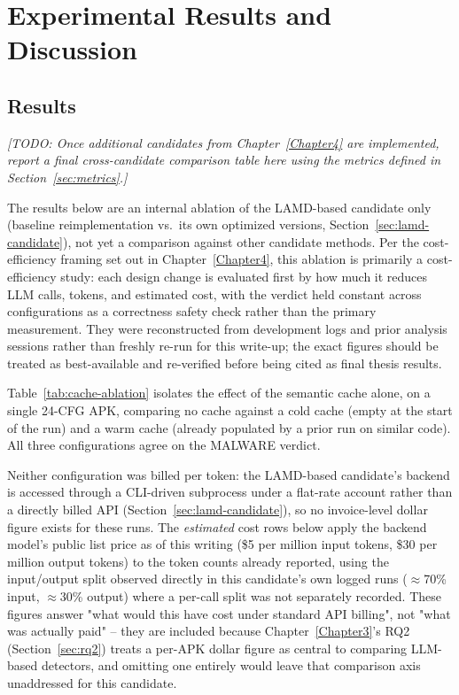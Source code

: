 \chapter{Experimental Results and Discussion}
\label{Chapter5}

\section{Results}

\textit{[TODO: Once additional candidates from Chapter~\ref{Chapter4} are
implemented, report a final cross-candidate comparison table here using the
metrics defined in Section~\ref{sec:metrics}.]}

The results below are an internal ablation of the LAMD-based candidate
only (baseline reimplementation vs.\ its own optimized versions,
Section~\ref{sec:lamd-candidate}), not yet a comparison against other
candidate methods. Per the cost-efficiency framing set out in
Chapter~\ref{Chapter4}, this ablation is primarily a cost-efficiency
study: each design change is evaluated first by how much it reduces LLM
calls, tokens, and estimated cost, with the verdict held constant across
configurations as a correctness safety check rather than the primary
measurement. They were reconstructed from development logs and prior
analysis sessions rather than freshly re-run for this write-up; the exact
figures should be treated as best-available and re-verified before being
cited as final thesis results.

Table~\ref{tab:cache-ablation} isolates the effect of the semantic cache
alone, on a single 24-CFG APK, comparing no cache against a cold cache
(empty at the start of the run) and a warm cache (already populated by a
prior run on similar code). All three configurations agree on the
MALWARE verdict.

Neither configuration was billed per token: the LAMD-based candidate's
backend is accessed through a CLI-driven subprocess under a flat-rate
account rather than a directly billed API (Section~\ref{sec:lamd-candidate}),
so no invoice-level dollar figure exists for these runs. The \emph{estimated}
cost rows below apply the backend model's public list price as of this
writing (\$5 per million input tokens, \$30 per million output tokens) to
the token counts already reported, using the input/output split observed
directly in this candidate's own logged runs ($\approx$70\% input,
$\approx$30\% output) where a per-call split was not separately recorded.
These figures answer "what would this have cost under standard API
billing", not "what was actually paid" -- they are included because
Chapter~\ref{Chapter3}'s RQ2 (Section~\ref{sec:rq2}) treats a per-APK dollar
figure as central to comparing LLM-based detectors, and omitting one
entirely would leave that comparison axis unaddressed for this candidate.

